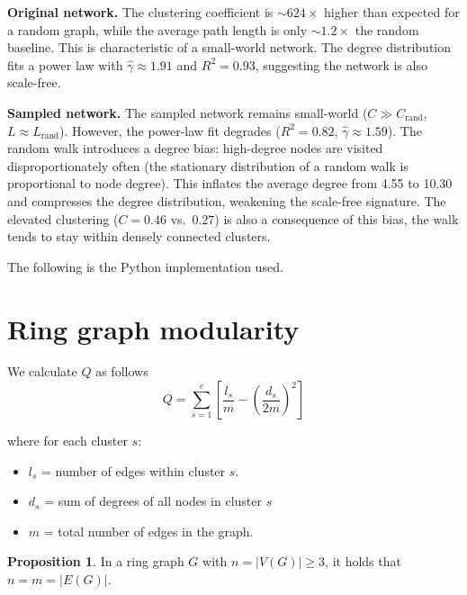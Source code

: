 \documentclass[12pt]{article}
\theoremstyle{definition}
\newtheorem{proposition}[theorem]{Proposition}
\begin{document}
\textbf{Original network.} The clustering coefficient is ${\sim}624\times$ higher than expected for a random graph, while the average path length is only ${\sim}1.2\times$ the random baseline. This is characteristic of a small-world network. The degree distribution fits a power law with $\hat{\gamma} \approx 1.91$ and $R^2 = 0.93$, suggesting the network is also scale-free.

\textbf{Sampled network.} The sampled network remains small-world ($C \gg C_{\text{rand}}$, $L \approx L_{\text{rand}}$). However, the power-law fit degrades ($R^2 = 0.82$, $\hat{\gamma} \approx 1.59$). The random walk introduces a degree bias: high-degree nodes are visited disproportionately often (the stationary distribution of a random walk is proportional to node degree). This inflates the average degree from 4.55 to 10.30 and compresses the degree distribution, weakening the scale-free signature. The elevated clustering ($C = 0.46$ vs.\ $0.27$) is also a consequence of this bias, the walk tends to stay within densely connected clusters.

The following is the Python implementation used.



\newpage
\section{Ring graph modularity}
We calculate $Q$ as follows
\begin{equation}
  \label{eq:1}
  Q = \sum_{s=1}^{c} \left[ \frac{l_s}{m} - \left(\frac{d_s}{2m}\right)^2 \right]
\end{equation}

\noindent
where for each cluster $s$:

\begin{itemize}
  \item $l_s$ = number of edges within cluster $s$.
  \item $d_s$ = sum of degrees of all nodes in cluster $s$
  \item $m$ = total number of edges in the graph.
\end{itemize}


\begin{proposition}
  \label{prop:3.1}
  In a ring graph $G$ with $n = |V(G)| \geq 3$, it holds that $n = m = |E(G)|$.
\end{proposition}
\end{document}
